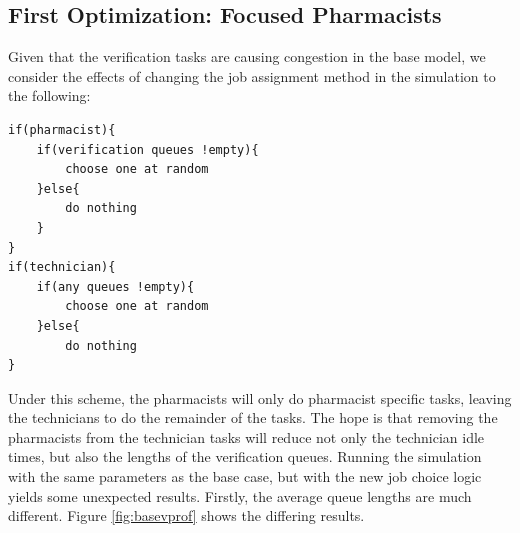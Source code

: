 \documentclass[10pt]{report}            %
\begin{document}
\subsection*{First Optimization: Focused Pharmacists}
Given that the verification tasks are causing congestion in the base model, we consider the effects of changing the job assignment method in the simulation to the following:
\begin{verbatim}
if(pharmacist){
    if(verification queues !empty){
        choose one at random
    }else{
        do nothing
    }
}
if(technician){
    if(any queues !empty){
        choose one at random
    }else{
        do nothing
}
\end{verbatim}
Under this scheme, the pharmacists will only do pharmacist specific tasks, leaving the technicians to do the remainder of the tasks. The hope is that removing the pharmacists from the technician tasks will reduce not only the technician idle times, but also the lengths of the verification queues. Running the simulation with the same parameters as the base case, but with the new job choice logic yields some unexpected results. Firstly, the average queue lengths are much different. Figure \ref{fig:basevprof} shows the differing results.
\end{document}
